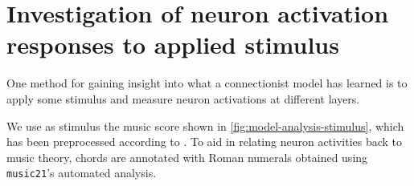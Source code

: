 \documentclass[dissertation.tex]{subfiles}
\begin{document}

\section{Investigation of neuron activation responses to applied stimulus}

One method for gaining insight into what a connectionist model has learned is
to apply some stimulus and measure neuron activations at different layers.

We use as stimulus the music score shown in
\autoref{fig:model-analysis-stimulus}, which has been preprocessed according to
. To aid in relating neuron activities back to music
theory, chords are annotated with Roman numerals obtained using {\tt music21}'s
automated analysis.
\end{document}
